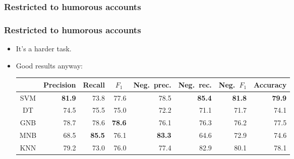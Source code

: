\subsubsection{Restricted to humorous accounts}
\begin{frame}
    \frametitle{Restricted to humorous accounts}

    \begin{itemize}
        \item It's a harder task.
        \item Good results anyway:

        \begin{center}
            \scriptsize
            \begin{tabular}{ c r r r r r r r }
                & \multicolumn{1}{c}{Precision} & \multicolumn{1}{c}{Recall} & \multicolumn{1}{c}{$F_1$} & \multicolumn{1}{c}{Neg.\ prec.} & \multicolumn{1}{c}{Neg.\ rec.} & \multicolumn{1}{c}{Neg.\ $F_1$} & \multicolumn{1}{c}{Accuracy} \\
                \midrule
                SVM & \textbf{81.9} & 73.8 & 77.6 & 78.5 & \textbf{85.4} & \textbf{81.8} & \textbf{79.9} \\
                \midrule
                DT & 74.5 & 75.5 & 75.0 & 72.2 & 71.1 & 71.7 & 74.1 \\
                \midrule
                GNB & 78.7 & 78.6 & \textbf{78.6} & 76.1 & 76.3 & 76.2 & 77.5 \\
                \midrule
                MNB & 68.5 & \textbf{85.5} & 76.1 & \textbf{83.3} & 64.6 & 72.9 & 74.6 \\
                \midrule
                KNN & 79.2 & 73.0 & 76.0 & 77.4 & 82.9 & 80.1 & 78.1 \\
            \end{tabular}
        \end{center}
    \end{itemize}
\end{frame}

